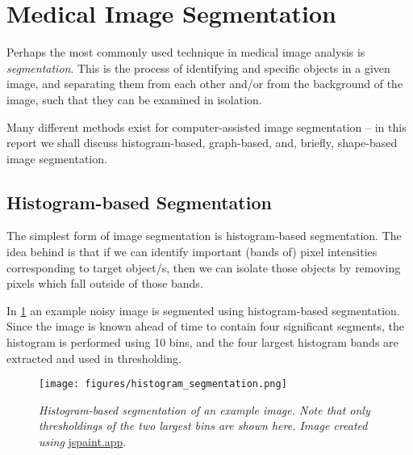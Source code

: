 \section{Medical Image Segmentation}

Perhaps the most commonly used technique in medical image analysis is
\textit{segmentation}.
%
This is the process of identifying and specific objects in a given image, and
separating them from each other and/or from the background of the image, such
that they can be examined in isolation.

Many different methods exist for computer-assisted image segmentation -- in this
report we shall discuss histogram-based, graph-based, and, briefly, shape-based
image segmentation.


\subsection{Histogram-based Segmentation}
\label{sec:hist-seg}

The simplest form of image segmentation is histogram-based segmentation. The
idea behind is that if we can identify important (bands of) pixel intensities
corresponding to target object/s, then we can isolate those objects by removing
pixels which fall outside of those bands.

In \cref{fig:hist-seg} an example noisy image is segmented using histogram-based
segmentation. Since the image is known ahead of time to contain four significant
segments, the histogram is performed using 10 bins, and the four largest histogram
bands are extracted and used in thresholding.

\begin{figure}%
  \centering
  \texttt{[image: figures/histogram\_segmentation.png]}
  \caption{\small \textit{Histogram-based segmentation of an example image. Note
  that only thresholdings of the two largest bins are shown here. Image created
  using } \url{jspaint.app}.}
\label{fig:hist-seg}
\end{figure}


